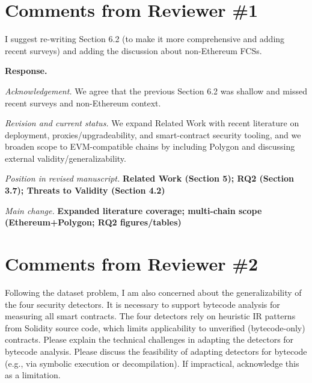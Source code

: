 \documentclass[acmsmall]{acmart}
\begin{document}
	\newpage
	\section{Comments from Reviewer \#1}

	\begin{tcolorbox}
		[commentbox,title=Reviewer \#1 -- Comment 1] I suggest re-writing Section 6.2 (to make it
		more comprehensive and adding recent surveys) and adding the discussion about non-Ethereum FCSs.
	\end{tcolorbox}

	\noindent
	\textbf{Response.}

	\textit{Acknowledgement.} We agree that the previous Section 6.2 was shallow and missed recent surveys
	and non-Ethereum context.

	\textit{Revision and current status.} We expand Related Work with recent literature on
	deployment, proxies/upgradeability, and smart-contract security tooling, and we broaden scope to
	EVM-compatible chains by including Polygon and discussing external validity/generalizability.

	\vspace{0.25em}
	\textit{Position in revised manuscript.}
	{\color{red}\textbf{Related Work (Section 5); RQ2 (Section 3.7); Threats to Validity (Section 4.2)}}

	\textit{Main change.}
	{\color{blue}\textbf{Expanded literature coverage; multi-chain scope (Ethereum+Polygon; RQ2 figures/tables)}}

	\newpage
	\section{Comments from Reviewer \#2}

	\begin{tcolorbox}
		[commentbox,title=Reviewer \#2 -- Comment 1] Following the dataset problem, I am also
		concerned about the generalizability of the four security detectors. It is necessary to support
		bytecode analysis for measuring all smart contracts. The four detectors rely on heuristic IR
		patterns from Solidity source code, which limits applicability to unverified (bytecode-only)
		contracts. Please explain the technical challenges in adapting the detectors for bytecode
		analysis. Please discuss the feasibility of adapting detectors for bytecode (e.g., via
		symbolic execution or decompilation). If impractical, acknowledge this as a limitation.
	\end{tcolorbox}
\end{document}
